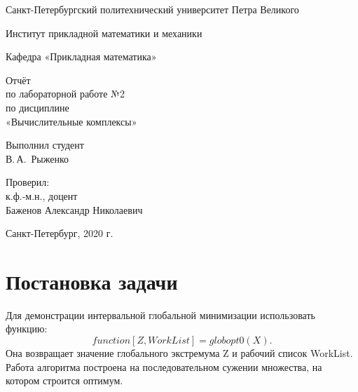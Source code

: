 \documentclass[12pt,a4paper]{scrartcl}
\begin{document}
\begin{titlepage}
  \begin{center}

    Санкт-Петербургский политехнический университет Петра Великого

    \vspace{0.25cm}
    
    Институт прикладной математики и механики
    
    Кафедра «Прикладная математика»
    \vfill

	\vspace{0.25cm}
	    Отчёт\\
	по лабораторной работе №2\\
	по дисциплине\\
	«Вычислительные комплексы»

  \bigskip

\end{center}
\vfill

\newlength{\ML}
\hfill\begin{minipage}{0.4\textwidth}
  Выполнил студент\\ В.\,А.~Рыженко\\
\end{minipage}%
\bigskip

\hfill\begin{minipage}{0.4\textwidth}
  Проверил:\\
к.ф.-м.н., доцент\\
Баженов Александр Николаевич\\
\end{minipage}%
\vfill

\begin{center}
  Санкт-Петербург, 2020 г.
\end{center}
\end{titlepage}

\tableofcontents
\newpage


\section{Постановка задачи}

Для демонстрации интервальной глобальной минимизации использовать функцию:
\begin{equation}
    function [Z, WorkList] = globopt0(X).
\end{equation}
Она возвращает значение глобального экстремума Z и рабочий список WorkList. Работа алгоритма построена на последовательном сужении множества, на котором строится оптимум.
\end{document}
